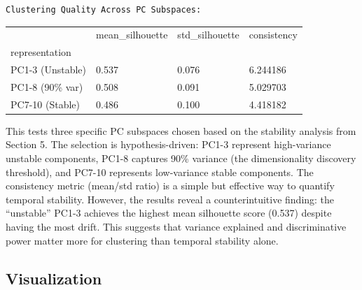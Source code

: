 \documentclass[
  letterpaper,
  DIV=11,
  numbers=noendperiod]{scrartcl}
\begin{document}
\begin{verbatim}
Clustering Quality Across PC Subspaces:
\end{verbatim}

\begin{longtable}[]{@{}llll@{}}
\toprule\noalign{}
& mean\_silhouette & std\_silhouette & consistency \\
representation & & & \\
\midrule\noalign{}
\endhead
\bottomrule\noalign{}
\endlastfoot
PC1-3 (Unstable) & 0.537 & 0.076 & 6.244186 \\
PC1-8 (90\% var) & 0.508 & 0.091 & 5.029703 \\
PC7-10 (Stable) & 0.486 & 0.100 & 4.418182 \\
\end{longtable}

This tests three specific PC subspaces chosen based on the stability
analysis from Section 5. The selection is hypothesis-driven: PC1-3
represent high-variance unstable components, PC1-8 captures 90\%
variance (the dimensionality discovery threshold), and PC7-10 represents
low-variance stable components. The consistency metric (mean/std ratio)
is a simple but effective way to quantify temporal stability. However,
the results reveal a counterintuitive finding: the ``unstable'' PC1-3
achieves the highest mean silhouette score (0.537) despite having the
most drift. This suggests that variance explained and discriminative
power matter more for clustering than temporal stability alone.

\subsection{Visualization}\label{visualization}
\end{document}
